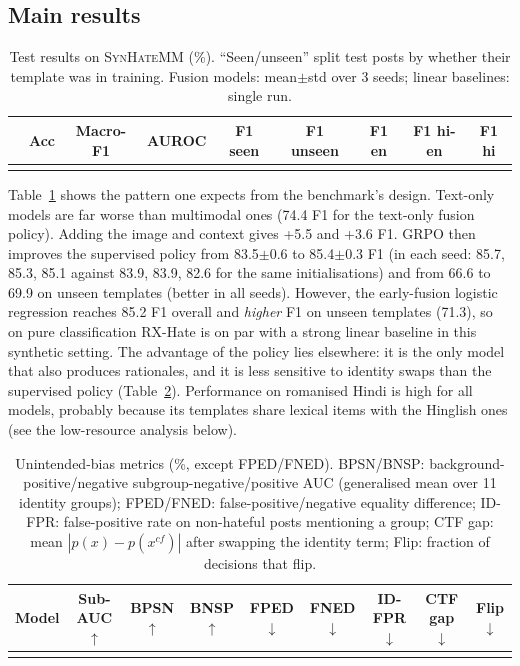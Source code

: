 \documentclass[11pt]{article}
\newcommand{\RX}{RX-Hate}
\begin{document}
\subsection{Main results}
\begin{table}[t]
\centering\small\setlength{\tabcolsep}{3.6pt}
\begin{tabular}{lcccccccc}
\toprule
 & Acc & Macro-F1 & AUROC & F1 seen & F1 unseen & F1 en & F1 hi-en & F1 hi \\
\midrule
\\
\bottomrule
\end{tabular}
\caption{Test results on \textsc{SynHateMM} (\%). ``Seen/unseen'' split test posts by whether their template was in training.
Fusion models: mean$\pm$std over 3 seeds; linear baselines: single run.}
\label{tab:main}
\end{table}

Table~\ref{tab:main} shows the pattern one expects from the benchmark's design. Text-only models are far worse than multimodal ones
(74.4 F1 for the text-only fusion policy). Adding the image and context gives +5.5 and +3.6 F1.
GRPO then improves the supervised policy from 83.5$\pm$0.6 to 85.4$\pm$0.3 F1 (in each seed: 85.7, 85.3, 85.1 against 83.9, 83.9, 82.6 for the same initialisations) and from 66.6 to 69.9 on unseen templates (better in all seeds). However, the early-fusion logistic regression reaches 85.2 F1 overall and
\emph{higher} F1 on unseen templates (71.3), so on pure classification \RX{} is on par with a strong linear baseline in this
synthetic setting. The advantage of the policy lies elsewhere: it is the only model that also produces rationales, and it is less sensitive to identity swaps than the supervised policy (Table~\ref{tab:fair}).
Performance on romanised Hindi is high for all models, probably because its templates share lexical items with the Hinglish ones (see the low-resource analysis below).

\begin{table}[t]
\centering\small\setlength{\tabcolsep}{4pt}
\begin{tabular}{lcccccccc}
\toprule
Model & Sub-AUC$\uparrow$ & BPSN$\uparrow$ & BNSP$\uparrow$ & FPED$\downarrow$ & FNED$\downarrow$ & ID-FPR$\downarrow$ & CTF gap$\downarrow$ & Flip$\downarrow$\\
\midrule
\\
\bottomrule
\end{tabular}
\caption{Unintended-bias metrics (\%, except FPED/FNED). BPSN/BNSP: background-positive/negative subgroup-negative/positive AUC
(generalised mean over 11 identity groups); FPED/FNED: false-positive/negative equality difference; ID-FPR: false-positive rate on non-hateful posts mentioning a group;
CTF gap: mean $|p(x)-p(x^{cf})|$ after swapping the identity term; Flip: fraction of decisions that flip.}
\label{tab:fair}
\end{table}
\end{document}
